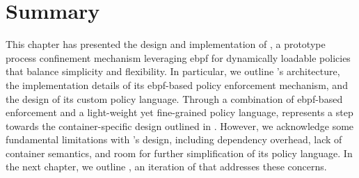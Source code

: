\section{Summary}%
\label{s:bpfbox-summary}

This chapter has presented the design and implementation of \bpfbox{}, a prototype process
confinement mechanism leveraging \gls{ebpf} for dynamically loadable policies that balance
simplicity and flexibility. In particular, we outline \bpfbox{}'s architecture, the
implementation details of its \gls{ebpf}-based policy enforcement mechanism, and the
design of its custom policy language. Through a combination of \gls{ebpf}-based
enforcement and a light-weight yet fine-grained policy language, \bpfbox{} represents
a step towards the container-specific design outlined in . However, we
acknowledge some fundamental limitations with \bpfbox{}'s design, including dependency
overhead, lack of container semantics, and room for further simplification of its policy
language. In the next chapter, we outline \bpfcontain{}, an iteration of \bpfbox{} that
addresses these concerns.
